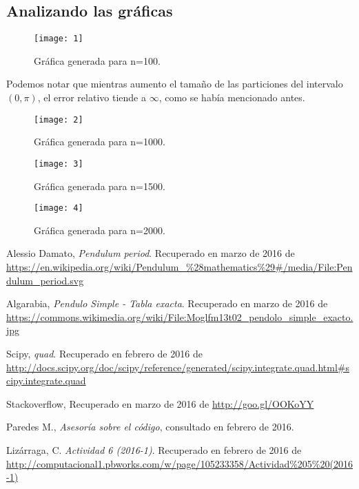 \documentclass[12pt]{article}
\begin{document}
\subsection*{Analizando las gráficas}
\begin{figure}[H]
\centering
\texttt{[image: 1]}
\caption{Gráfica generada para n=100.}
\end{figure}

Podemos notar que mientras aumento el tamaño de las particiones del intervalo $(0,\pi)$, el error relativo tiende a $\infty$, como se había mencionado antes.

\begin{figure}[H]
\centering
\texttt{[image: 2]}
\caption{Gráfica generada para n=1000.}
\end{figure}

\begin{figure}[H]
\centering
\texttt{[image: 3]}
\caption{Gráfica generada para n=1500.}
\end{figure}

\begin{figure}[H]
\centering
\texttt{[image: 4]}
\caption{Gráfica generada para n=2000.}
\end{figure}

\pagebreak

\begin{thebibliography}{6}

Alessio Damato,
\emph{Pendulum period}. Recuperado en marzo de 2016 de \url{https://en.wikipedia.org/wiki/Pendulum_\%28mathematics\%29\#/media/File:Pendulum_period.svg}

Algarabia,
\emph{Pendulo Simple - Tabla exacta}. Recuperado en marzo de 2016 de \url{https://commons.wikimedia.org/wiki/File:Moglfm13t02_pendolo_simple_exacto.jpg}

Scipy,
\emph{quad}. Recuperado en febrero de 2016 de \url{http://docs.scipy.org/doc/scipy/reference/generated/scipy.integrate.quad.html#scipy.integrate.quad}

Stackoverflow,
Recuperado en marzo de 2016 de \url{http://goo.gl/OOKoYY}

Paredes M., \emph{Asesoría sobre el código}, consultado en febrero de 2016.

Lizárraga, C.
\emph{Actividad 6 (2016-1)}. Recuperado en febrero de 2016 de \url{http://computacional1.pbworks.com/w/page/105233358/Actividad\%205\%20(2016-1)}

\end{thebibliography}
\end{document}
